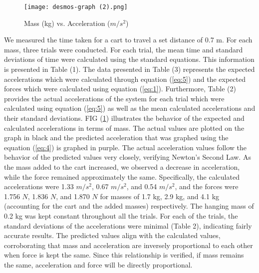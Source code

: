 \documentclass[twocolumn, 10pt]{article}
\begin{document}
\begin{figure} [H]
    \centering
    \texttt{[image: desmos-graph (2).png]}
    \caption{Mass (kg) vs. Acceleration ($m/s^2$)}
    \label{fig:graph of acceleration}
\end{figure}


 \indent We measured the time taken for a cart to travel a set distance of 0.7 m. For each mass, three trials were conducted. For each trial, the mean time and standard deviations of time were calculated using the standard equations. This information is presented in Table (1). The data presented in Table (3) represents the expected accelerations which were calculated through equation (\ref{eq:5}) and the expected forces which were calculated using equation (\ref{eq:1}). Furthermore,  Table (2) provides the actual accelerations of the system for each trial which were calculated using equation (\ref{eq:5}) as well as the mean calculated accelerations and their standard deviations.
\newline \indent FIG (\ref{fig:graph of acceleration}) illustrates the behavior of the expected and calculated accelerations in terms of mass. The actual values are plotted on the graph in black and the predicted acceleration that was graphed using the equation (\ref{eq:4}) is graphed in purple. The actual acceleration values follow the behavior of the predicted values very closely, verifying Newton's Second Law. As the mass added to the cart increased, we observed a decrease in acceleration, while the force remained approximately the same. Specifically, the calculated accelerations were 1.33 $m/s^2$, 0.67 $m/s^2$, and 0.54 $m/s^2$, and the forces were 1.756 $N$, 1.836 $N$, and 1.870 $N$ for masses of 1.7 kg, 2.9 kg, and 4.1 kg (accounting for the cart and the added masses)  respectively. The hanging mass of 0.2 kg was kept constant throughout all the trials. 
\newline \indent For each of the trials, the standard deviations of the accelerations were minimal (Table 2), indicating fairly accurate results. The predicted values align with the calculated values, corroborating that mass and acceleration are inversely proportional to each other when force is kept the same. Since this relationship is verified, if mass remains the same,  acceleration and force will be directly proportional. 
\end{document}
